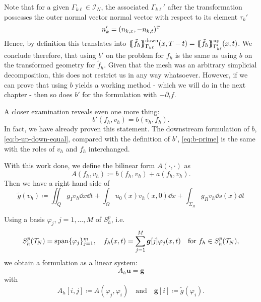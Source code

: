 \documentclass[../thesis.tex]{subfiles}
\begin{document}
Note that for a given $\Gamma_{k\ell} \in \mathcal{I}_N$, the associated $\Gamma_{k\ell}'$ after the transformation possesses the outer normal vector normal vector with respect to its element $\tau_k'$
\[
	n_k' = (n_{k,x}, -n_{k,t})^\tp
\]
Hence, by definition this translates into $\ldwnd \tilde{f}_h \rdwnd_{\Gamma_{k \ell}}(x, T - t) = \lupw \tilde{f}_h \rupw_{\Gamma_{k \ell}'}(x, t)$.
We conclude therefore, that using $b'$ on the problem for $f_h$ is the same as using $b$ on the transformed geometry for $\tilde{f}_h$. Given that the mesh was an arbitrary simplicial decomposition, this does not restrict us in any way whatsoever.
However, if we can prove that using $b$ yields a working method - which we will do in the next chapter - then so does $b'$ for the formulation with $- \partial_t f$.

A closer examination reveals even one more thing:
\[
	b'(f_h, v_h) = b(v_h, f_h).
\]
In fact, we have already proven this statement. The downstream formulation of $b$, \cref{eq:b-up-down-equal}, compared with the definition of $b'$, \cref{eq:b-prime} is the same with the roles of $v_h$ and $f_h$ interchanged.

With this work done, we define the bilinear form $A(\cdot, \cdot)$ as
\[
	A(f_h, v_h) \coloneqq b(f_h, v_h) + a(f_h, v_h).
\]
Then we have a right hand side of
\[
	\tilde{g}(v_h) \coloneqq \iint_Q g_I v_h \dd x \dd t + \int_\Omega u_0(x) v_h(x, 0) \dd x + \int_{\Sigma_R} g_R v_h \dd s(x) \dd t 
\]

Using a basis $\varphi_j$, $j = 1, \ldots, M$ of $S_h^p$, i.e.
\[
	S_h^p(\mathcal{T}_N) = \operatorname*{span} \{ \varphi_j \}_{j=1}^m, \quad f_h(x, t) = \sum_{j=1}^M \boldsymbol{g}[j] \varphi_j(x, t) \quad \text{for } f_h \in S_h^p(\mathcal{T}_N),
\]
we obtain a formulation as a linear system:
\[
	A_h \boldsymbol{u} = \boldsymbol{g}
\]
with
\[
	A_h[i, j] \coloneqq A(\varphi_j, \varphi_i) \quad \text{and} \quad \boldsymbol{g}[i] \coloneqq \tilde{g}(\varphi_i). 
\]
\end{document}
